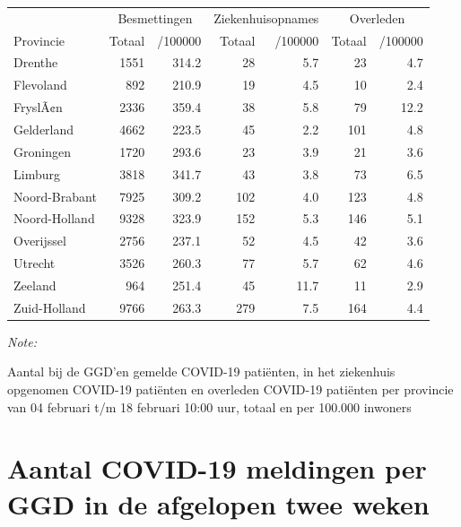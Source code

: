 \documentclass[
  english,
  man,floatsintext]{apa6}
\begin{document}
\begin{table}[H]
\centering
\begin{threeparttable}
\begin{tabular}{lrrrrrr}
\toprule
\multicolumn{1}{c}{ } & \multicolumn{2}{c}{Besmettingen} & \multicolumn{2}{c}{Ziekenhuisopnames} & \multicolumn{2}{c}{Overleden} \\
\cmidrule(l{3pt}r{3pt}){2-3} \cmidrule(l{3pt}r{3pt}){4-5} \cmidrule(l{3pt}r{3pt}){6-7}
Provincie & Totaal & /100000 & Totaal & /100000 & Totaal & /100000\\
\midrule
Drenthe & 1551 & 314.2 & 28 & 5.7 & 23 & 4.7\\
Flevoland & 892 & 210.9 & 19 & 4.5 & 10 & 2.4\\
FryslÃ¢n & 2336 & 359.4 & 38 & 5.8 & 79 & 12.2\\
Gelderland & 4662 & 223.5 & 45 & 2.2 & 101 & 4.8\\
Groningen & 1720 & 293.6 & 23 & 3.9 & 21 & 3.6\\
Limburg & 3818 & 341.7 & 43 & 3.8 & 73 & 6.5\\
Noord-Brabant & 7925 & 309.2 & 102 & 4.0 & 123 & 4.8\\
Noord-Holland & 9328 & 323.9 & 152 & 5.3 & 146 & 5.1\\
Overijssel & 2756 & 237.1 & 52 & 4.5 & 42 & 3.6\\
Utrecht & 3526 & 260.3 & 77 & 5.7 & 62 & 4.6\\
Zeeland & 964 & 251.4 & 45 & 11.7 & 11 & 2.9\\
Zuid-Holland & 9766 & 263.3 & 279 & 7.5 & 164 & 4.4\\
\bottomrule
\end{tabular}
\begin{tablenotes}
\item \textit{Note: } 
\item Aantal bij de GGD’en gemelde COVID-19 patiënten, in het ziekenhuis opgenomen COVID-19 patiënten en overleden COVID-19 patiënten per provincie van 04 februari t/m 18 februari 10:00 uur, totaal en per 100.000 inwoners
\end{tablenotes}
\end{threeparttable}
\end{table}

\newpage

\hypertarget{aantal-covid-19-meldingen-per-ggd-in-de-afgelopen-twee-weken}{%
\section{Aantal COVID-19 meldingen per GGD in de afgelopen twee weken}\label{aantal-covid-19-meldingen-per-ggd-in-de-afgelopen-twee-weken}}
\end{document}
